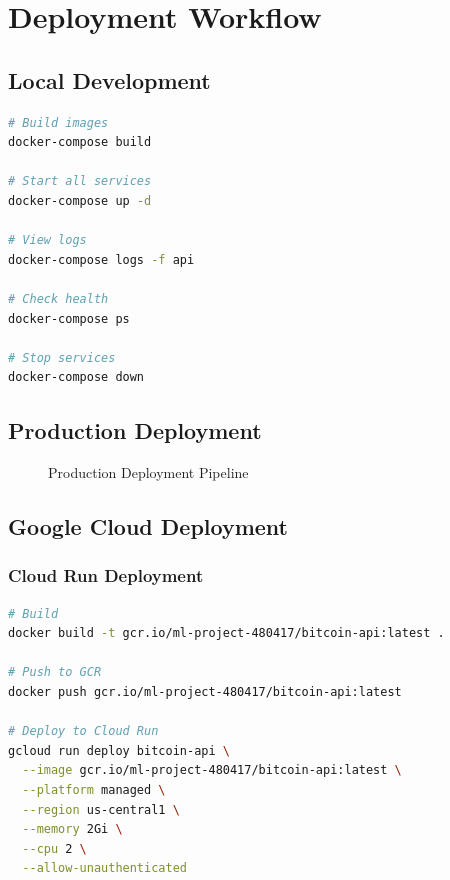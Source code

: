 \section{Deployment Workflow}

\subsection{Local Development}

\begin{lstlisting}[language=bash]
# Build images
docker-compose build

# Start all services
docker-compose up -d

# View logs
docker-compose logs -f api

# Check health
docker-compose ps

# Stop services
docker-compose down
\end{lstlisting}

\subsection{Production Deployment}

\begin{figure}[H]
\centering
{}
\caption{Production Deployment Pipeline}
\label{fig:deployment_pipeline}
\end{figure}

\subsection{Google Cloud Deployment}

\subsubsection{Cloud Run Deployment}
\begin{lstlisting}[language=bash]
# Build
docker build -t gcr.io/ml-project-480417/bitcoin-api:latest .

# Push to GCR
docker push gcr.io/ml-project-480417/bitcoin-api:latest

# Deploy to Cloud Run
gcloud run deploy bitcoin-api \
  --image gcr.io/ml-project-480417/bitcoin-api:latest \
  --platform managed \
  --region us-central1 \
  --memory 2Gi \
  --cpu 2 \
  --allow-unauthenticated
\end{lstlisting}

